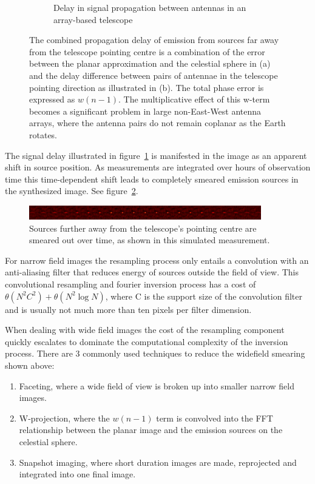 \documentclass[a4paper,10pt]{article}
\begin{document}
\begin{figure}[h!]
\begin{subfigure}[b]{0.45\textwidth}
    \caption{Delay in signal propagation between antennas in an array-based telescope}
  \end{subfigure}
  \caption[Widefield phase delay]{The combined propagation delay of emission from sources far away from the telescope pointing centre is a combination
  of the error between the planar approximation and the celestial sphere in (a) and the delay difference between pairs of antennae in the telescope
  pointing direction as illustrated in (b). The total phase error is expressed as $w(n-1)$. The multiplicative effect of this w-term becomes a
  significant problem in large non-East-West antenna arrays, where the antenna pairs do not remain coplanar as the Earth rotates.}
  \label{FIG_WIDEFIELD_ERROR}
\end{figure}

The signal delay illustrated in figure~\ref{FIG_WIDEFIELD_ERROR} is manifested in the image as an apparent shift 
in source position. As measurements are integrated over hours of observation time this time-dependent shift leads to completely
smeared emission sources in the synthesized image. See figure~\ref{FIG_SMEARING}.
\begin{figure}[h!]
 \centering
 \includegraphics[width=0.9\textwidth]{images/distortions.png}
 \caption[Wide field distortions]{Sources further away from the telescope's pointing centre are smeared out over time, as
 shown in this simulated measurement.}
 \label{FIG_SMEARING}
\end{figure}

For narrow field images the resampling process only entails a convolution with an anti-aliasing filter that reduces energy of 
sources outside the field of view. This convolutional resampling and fourier inversion process has a cost of 
$\theta(N^2C^2) + \theta(N^2\log{N})$, where C is the support size of the convolution filter and is usually not much more 
than ten pixels per filter dimension.

When dealing with wide field images the cost of the resampling component quickly escalates to dominate the computational
complexity of the inversion process. There are 3 commonly used techniques to reduce the widefield smearing shown above:
\begin{enumerate}
 \item Faceting, where a wide field of view is broken up into smaller narrow field images.
 \item W-projection, where the $w(n-1)$ term is convolved into the FFT relationship between the planar image and the emission sources
 on the celestial sphere.
 \item Snapshot imaging, where short duration images are made, reprojected and integrated into one final image.
\end{enumerate}
\end{document}
